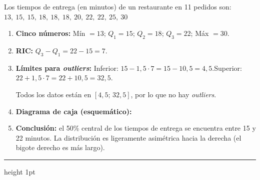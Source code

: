 \documentclass[11pt, letterpaper]{article}
\newcommand{\subbloque}[1]{%
  \vspace{14pt}
  \noindent{\large\bfseries\color{zenitnavy} #1}\par
  \vspace{4pt}\hrule height 1pt\vspace{8pt}}
\begin{document}
\begin{tcolorbox}[examplebox, title={Ej. 10. Construir e interpretar un diagrama de caja}]
Los tiempos de entrega (en minutos) de un restaurante en 11 pedidos son:
$13,\ 15,\ 15,\ 18,\ 18,\ 18,\ 20,\ 22,\ 22,\ 25,\ 30$

\begin{enumerate}[label=\textbf{Paso \arabic*.}]
  \item \textbf{Cinco n\'umeros:} M\'in $= 13$; $Q_1 = 15$; $Q_2 = 18$; $Q_3 = 22$; M\'ax $= 30$.
  \medskip
  \item \textbf{RIC:} $Q_3 - Q_1 = 22 - 15 = 7$.
  \medskip
  \item \textbf{L\'imites para \textit{outliers}:}
  Inferior: $15 - 1{,}5 \cdot 7 = 15 - 10{,}5 = 4{,}5$.\quad Superior: $22 + 1{,}5 \cdot 7 = 22 + 10{,}5 = 32{,}5$.

  Todos los datos est\'an en $[4{,}5;\, 32{,}5]$, por lo que no hay \textit{outliers}.
  \medskip
  \item \textbf{Diagrama de caja (esquem\'atico):}

  \begin{center}
  \end{center}

  \medskip
  \item \textbf{Conclusi\'on:} el 50\% central de los tiempos de entrega se encuentra entre 15 y 22 minutos. La distribuci\'on es ligeramente asim\'etrica hacia la derecha (el bigote derecho es m\'as largo).
\end{enumerate}
\end{tcolorbox}

\subbloque{Pr\'actica inmediata 5}
\end{document}
